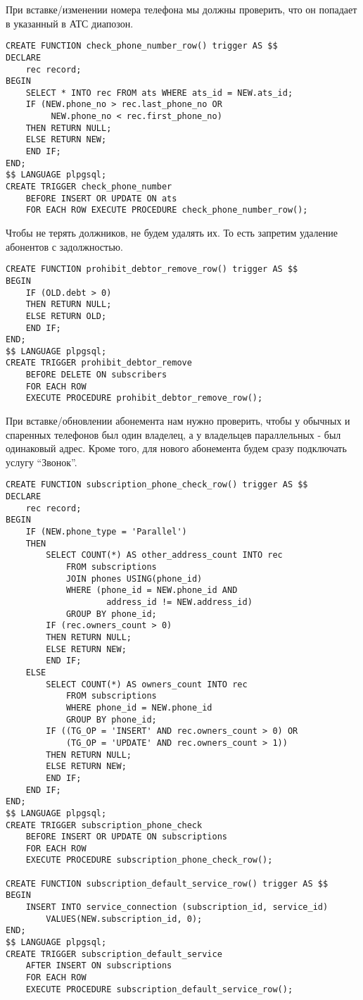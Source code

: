 \documentclass{report}
\begin{document}
При вставке/изменении номера телефона мы должны проверить, 
что он попадает в указанный в АТС диапозон.

\begin{lstlisting}
CREATE FUNCTION check_phone_number_row() trigger AS $$
DECLARE
    rec record;
BEGIN
    SELECT * INTO rec FROM ats WHERE ats_id = NEW.ats_id;
    IF (NEW.phone_no > rec.last_phone_no OR
         NEW.phone_no < rec.first_phone_no)
    THEN RETURN NULL;
    ELSE RETURN NEW;
    END IF;
END;
$$ LANGUAGE plpgsql;
CREATE TRIGGER check_phone_number 
    BEFORE INSERT OR UPDATE ON ats
    FOR EACH ROW EXECUTE PROCEDURE check_phone_number_row();
\end{lstlisting}

Чтобы не терять должников, не будем удалять их. То есть запретим
удаление абонентов с задолжностью.

\begin{lstlisting}
CREATE FUNCTION prohibit_debtor_remove_row() trigger AS $$
BEGIN
    IF (OLD.debt > 0)
    THEN RETURN NULL;
    ELSE RETURN OLD;
    END IF;
END;
$$ LANGUAGE plpgsql;
CREATE TRIGGER prohibit_debtor_remove 
    BEFORE DELETE ON subscribers
    FOR EACH ROW 
    EXECUTE PROCEDURE prohibit_debtor_remove_row();
\end{lstlisting}

При вставке/обновлении абонемента нам нужно проверить, чтобы у
обычных и спаренных телефонов был один владелец, а у владельцев
параллельных - был одинаковый адрес. Кроме того, для нового абонемента
будем сразу подключать услугу ``Звонок''.

\begin{lstlisting}
CREATE FUNCTION subscription_phone_check_row() trigger AS $$
DECLARE
    rec record;
BEGIN
    IF (NEW.phone_type = 'Parallel')
    THEN
        SELECT COUNT(*) AS other_address_count INTO rec 
            FROM subscriptions 
            JOIN phones USING(phone_id)
            WHERE (phone_id = NEW.phone_id AND 
                    address_id != NEW.address_id)
            GROUP BY phone_id;
        IF (rec.owners_count > 0)
        THEN RETURN NULL;
        ELSE RETURN NEW;
        END IF;
    ELSE
        SELECT COUNT(*) AS owners_count INTO rec 
            FROM subscriptions 
            WHERE phone_id = NEW.phone_id
            GROUP BY phone_id;
        IF ((TG_OP = 'INSERT' AND rec.owners_count > 0) OR 
            (TG_OP = 'UPDATE' AND rec.owners_count > 1))
        THEN RETURN NULL;
        ELSE RETURN NEW;
        END IF;
    END IF;
END;
$$ LANGUAGE plpgsql;
CREATE TRIGGER subscription_phone_check 
    BEFORE INSERT OR UPDATE ON subscriptions
    FOR EACH ROW 
    EXECUTE PROCEDURE subscription_phone_check_row();

CREATE FUNCTION subscription_default_service_row() trigger AS $$
BEGIN
    INSERT INTO service_connection (subscription_id, service_id)
        VALUES(NEW.subscription_id, 0);
END;
$$ LANGUAGE plpgsql;
CREATE TRIGGER subscription_default_service
    AFTER INSERT ON subscriptions
    FOR EACH ROW 
    EXECUTE PROCEDURE subscription_default_service_row();
\end{lstlisting}
\end{document}
